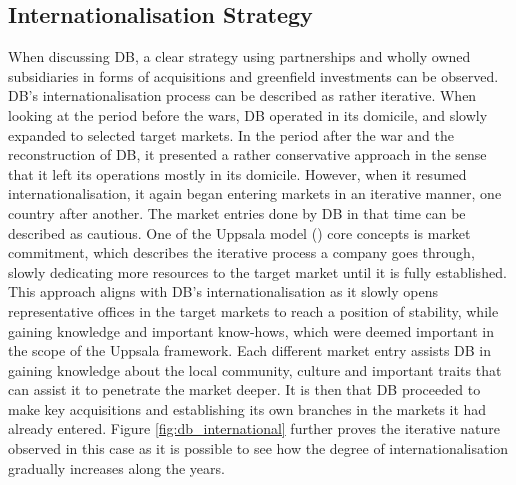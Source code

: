 \documentclass[11pt,a4paper]{article}
\begin{document}
{{{\subsection{Internationalisation Strategy}
\vspace{-1mm}
\label{int_strategy}
 \par
When discussing DB, a clear strategy using partnerships and wholly owned subsidiaries in forms of acquisitions and greenfield investments can be observed. DB's internationalisation process can be described as rather iterative. When looking at the period before the wars, DB operated in its domicile, and slowly expanded to selected target markets. In the period after the war and the reconstruction of DB, it presented a rather conservative approach in the sense that it left its operations mostly in its domicile. However, when it resumed internationalisation, it again began entering markets in an iterative manner, one country after another. The market entries done by DB in that time can be described as cautious. One of the Uppsala model (\citeyear{johansonInternationalizationProcessFirm1977}) core concepts is market commitment, which describes the iterative process a company goes through, slowly dedicating more resources to the target market until it is fully established. This approach aligns with DB's internationalisation as it slowly opens representative offices in the target markets to reach a position of stability, while gaining knowledge and important know-hows, which were deemed important in the scope of the Uppsala framework. Each different market entry assists DB in gaining knowledge about the local community, culture and important traits that can assist it to penetrate the market deeper. It is then that DB proceeded to make key acquisitions and establishing its own branches in the markets it had already entered. Figure \ref{fig:db_international} further proves the iterative nature observed in this case as it is possible to see how the degree of internationalisation gradually increases along the years. \par 
}}}
\end{document}
